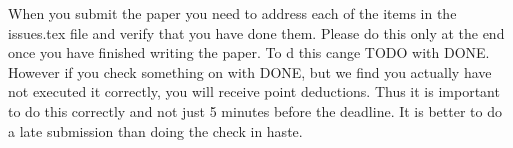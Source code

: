 \documentclass[sigconf]{acmart}
\begin{document}

 

\appendix

When you submit the paper you need to address each of the items in the
issues.tex file and verify that you have done them. Please do this
only at the end once you have finished writing the paper. To d this
cange TODO with DONE. However if you check something on with DONE, but
we find you actually have not executed it correctly, you will receive
point deductions. Thus it is important to do this correctly and not
just 5 minutes before the deadline. It is better to do a late
submission than doing the check in haste. 

%
\end{document}

